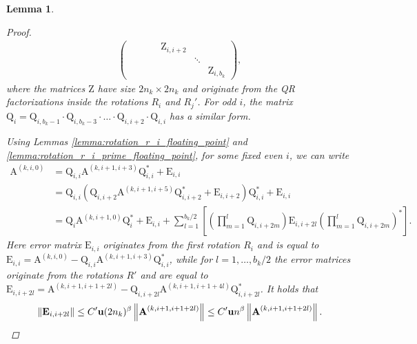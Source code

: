 \documentclass{article}
\newcommand{\lnorm}{\left\|}
\newcommand{\rnorm}{\right\|}
\newcommand{\lbrac}{\left[}
\newcommand{\rbrac}{\right]}
\newcommand{\lpar}{\left(}
\newcommand{\rpar}{\right)}
\newtheorem{lemma}{Lemma}[section]
\newcommand\matA{\boldsymbol{\mathrm{A}}}
\newcommand\matE{\boldsymbol{\mathrm{E}}}
\newcommand\matQ{\boldsymbol{\mathrm{Q}}}
\newcommand\matZ{\boldsymbol{\mathrm{Z}}}
\newcommand{\umach}{\textbf{\textup{u}}}
\newcommand{\cmm}{\beta}
\begin{document}
\begin{lemma}
\begin{proof}
\begin{align}
\begin{pmatrix}
                 &       &      &                 & \matZ_{i,i+2} &       &                  \\
                 &       &      &                 &                 & \ddots &                  \\
                 &       &      &                 &                 &       & \matZ_{i,b_k}
            \end{pmatrix},
        \end{align}
        where the matrices $\matZ$ have size $2n_k\times 2n_k$ and originate from the QR factorizations inside the rotations $R_i$ and $R_j'$. For odd $i$, the matrix $\matQ_i=\matQ_{i,b_k-1}\cdot\matQ_{i,b_k-3}\cdot\ldots\cdot\matQ_{i,i+2}\cdot\matQ_{i,i}$ has a similar form.

        Using Lemmas \ref{lemma:rotation_r_i_floating_point} and \ref{lemma:rotation_r_i_prime_floating_point}, for some fixed even $i$, we can write
        \begin{align*}
            \matA^{(k,i,0)}
            &=
            \matQ_{i,i}\matA^{(k,i+1,i+3)}\matQ_{i,i}^*+\matE_{i,i}
            \\
            &=
            \matQ_{i,i}\lpar
                \matQ_{i,i+2}\matA^{(k,i+1,i+5)}\matQ_{i,i+2}^* + \matE_{i,i+2}
            \rpar
            \matQ_{i,i}^*+\matE_{i,i}
            \\
            &=
            \matQ_i\matA^{(k,i+1,0)}\matQ_i^*
            +
            \matE_{i,i}
            +
            \sum_{l=1}^{b_k/2}
            \lbrac
                \lpar
                    \prod_{m=1}^{l}
                    \matQ_{i,i+2m}
                \rpar
                \matE_{i,i+2l}
                \lpar
                    \prod_{m=1}^{l}
                    \matQ_{i,i+2m}
                \rpar^*
            \rbrac.
        \end{align*}
        Here error matrix $\matE_{i,i}$ originates from the first rotation $R_i$ and is equal to $\matE_{i,i}=\matA^{(k,i,0)}-\matQ_{i,i}\matA^{(k,i+1,i+3)}\matQ_{i,i}^*$, while for $l=1,\ldots,b_k/2$ the error matrices originate from the rotations $R'$ and are equal to $\matE_{i,i+2l}=\matA^{(k,i+1,i+1+2l)}-\matQ_{i,i+2l}\matA^{(k,i+1,i+1+4l)}\matQ_{i,i+2l}^*$. It holds that
        \begin{align*}
            \lnorm
                \matE_{i,i+2l}
            \rnorm
            \leq
            C'\umach (2n_k)^{\cmm} \lnorm \matA^{(k,i+1,i+1+2l)} \rnorm
            \leq C'\umach n^{\cmm} \lnorm \matA^{(k,i+1,i+1+2l)} \rnorm.

\end{align*}
\end{proof}
\end{lemma}
\end{document}
